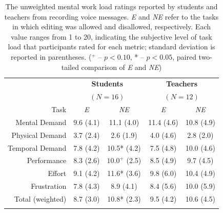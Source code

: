 \begin{table}
	\centering
	\begin{tabular}{r c c c c}
		& \multicolumn{2}{c}{\textbf{Students}} & \multicolumn{2}{c}{\textbf{Teachers}}\\
		& \multicolumn{2}{c}{$(N=16)$} & \multicolumn{2}{c}{$(N=12)$}\\
		\toprule
		Task			& \textit{E} & \textit{NE} & \textit{E} & \textit{NE}\\
		Mental Demand   & 9.6 (4.1) & 11.1 (4.0) & 11.4 (4.6) & 10.8 (4.9) \\
		Physical Demand & 3.7 (2.4) & 2.6 (1.9) & 4.0 (4.6) & 2.8 (2.0) \\
		Temporal Demand & 7.8 (4.2) & 10.5* (4.2) & 7.5 (4.8) & 10.0 (4.6) \\
		Performance     & 8.3 (2.6) & $10.0^+$ (2.5) & 8.5 (4.9) & 9.7 (4.5) \\
		Effort          & 9.1 (4.2) & 11.6* (3.6) & 9.8 (6.0) & 10.4 (4.9) \\
		Frustration     & 7.8 (4.3) & 8.9 (4.1) & 8.4 (5.6) & 10.0 (5.9) \\
		\midrule
		Total (weighted)& 8.7 (3.0) & 10.8* (2.3) & 9.5 (4.2) & 10.6 (4.5) \\
		\bottomrule \\
	\end{tabular}
	\caption{The unweighted mental work load ratings reported by students and teachers from recording voice messages. \textit{E} and \textit{NE} refer to the tasks in which editing was allowed and disallowed, respectively. Each value ranges from 1 to 20, indicating the subjective level of task load that participants rated for each metric; standard deviation is reported in parentheses. ($^+$ -- $p<0.10$, * -- $p<0.05$, paired two-tailed comparison of \textit{E} and \textit{NE})}~\label{tab:table1}
\end{table}

